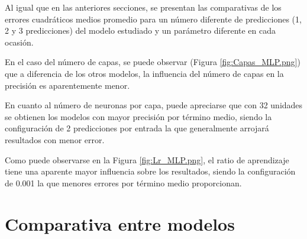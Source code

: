 Al igual que en las anteriores secciones, se presentan las comparativas de los errores 
cuadráticos medios promedio para un número diferente de predicciones (1, 2 y 3 predicciones) del modelo 
estudiado y un parámetro diferente en cada ocasión.

En el caso del número de capas, se puede observar (Figura \ref{fig:Capas_MLP.png}) que a diferencia de
los otros modelos, la influencia del número de capas en la precisión es aparentemente menor.

En cuanto al número de neuronas por capa, puede apreciarse que con 32 unidades se obtienen los modelos
con mayor precisión por término medio, siendo la configuración de 2 predicciones por entrada la que
generalmente arrojará resultados con menor error.

Como puede observarse en la Figura \ref{fig:Lr_MLP.png}, el ratio de aprendizaje tiene una aparente
mayor influencia sobre los resultados, siendo la configuración de 0.001 la que menores errores por
término medio proporcionan.

\section{Comparativa entre modelos}
